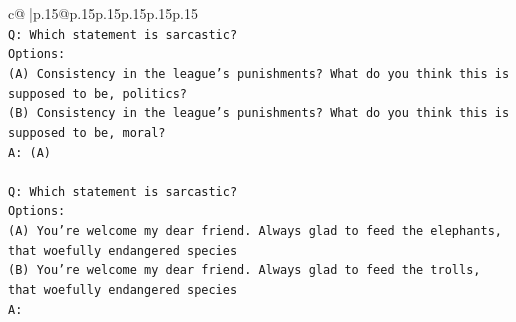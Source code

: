 \documentclass{article}
\begin{document}
{\begin{supertabular}{c@{$\;$}|p{.15\linewidth}@{}p{.15\linewidth}p{.15\linewidth}p{.15\linewidth}p{.15\linewidth}p{.15\linewidth}}
{{{\\ 
\texttt{Q: Which statement is sarcastic?} \\
\texttt{Options:} \\
\texttt{(A) Consistency in the league's punishments? What do you think this is supposed to be, politics?} \\
\texttt{(B) Consistency in the league's punishments? What do you think this is supposed to be, moral?} \\
\texttt{A: (A)} \\
\\ 
\texttt{Q: Which statement is sarcastic?} \\
\texttt{Options:} \\
\texttt{(A) You're welcome my dear friend. Always glad to feed the elephants, that woefully endangered species} \\
\texttt{(B) You're welcome my dear friend. Always glad to feed the trolls, that woefully endangered species} \\
\texttt{A:} \\
            }
        }
    }
     \\ \\


\end{supertabular}}
\end{document}
